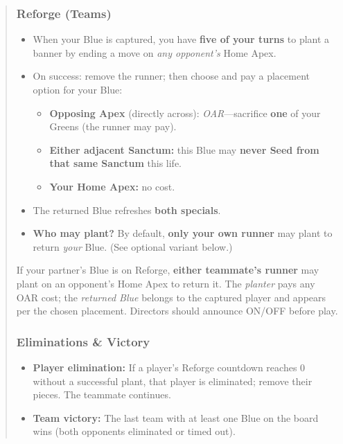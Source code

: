 \documentclass[11pt]{article}
\begin{document}
\begin{quote}
\subsubsection*{Reforge (Teams)}
\begin{itemize}[leftmargin=1.3em,itemsep=0.25em]
  \item When your Blue is captured, you have \textbf{five of your turns} to plant a banner by ending a move on \emph{any opponent’s} Home Apex.
  \item On success: remove the runner; then choose and pay a placement option for your Blue:
  \begin{itemize}[leftmargin=1.3em,itemsep=0.15em]
    \item \textbf{Opposing Apex} (directly across): \textit{OAR}—sacrifice \textbf{one} of your Greens (the runner may pay).
    \item \textbf{Either adjacent Sanctum:} this Blue may \textbf{never Seed from that same Sanctum} this life.
    \item \textbf{Your Home Apex:} no cost.
  \end{itemize}
  \item The returned Blue refreshes \textbf{both specials}.
  \item \textbf{Who may plant?} By default, \textbf{only your own runner} may plant to return \emph{your} Blue. (See optional variant below.)
\end{itemize}

\begin{tcolorbox}[enhanced,breakable,title={Variant — Ally Plant Assist (Optional)},
  colback=white,colframe=royal,boxrule=0.8pt]
\small
If your partner’s Blue is on Reforge, \textbf{either teammate’s runner} may plant on an opponent’s Home Apex to return it. The \emph{planter} pays any OAR cost; the \emph{returned Blue} belongs to the captured player and appears per the chosen placement. Directors should announce ON/OFF before play.
\end{tcolorbox}

\subsubsection*{Eliminations \& Victory}
\begin{itemize}[leftmargin=1.3em,itemsep=0.25em]
  \item \textbf{Player elimination:} If a player’s Reforge countdown reaches 0 without a successful plant, that player is eliminated; remove their pieces. The teammate continues.
  \item \textbf{Team victory:} The last team with at least one Blue on the board wins (both opponents eliminated or timed out).
\end{itemize}


\end{quote}
\end{document}
